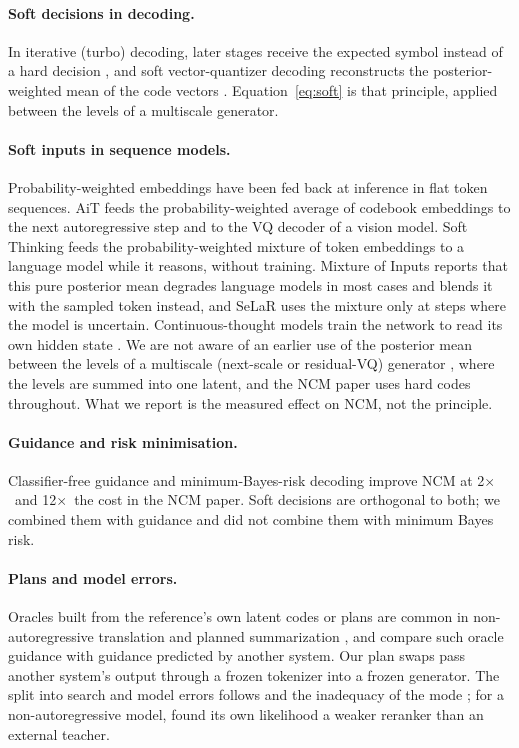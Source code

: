 \documentclass[11pt]{article}
\newcommand{\x}{$\times$}
\begin{document}
\paragraph{Soft decisions in decoding.} In iterative (turbo) decoding, later stages receive the expected symbol
instead of a hard decision \citep{wang1999iterative}, and soft vector-quantizer decoding reconstructs the
posterior-weighted mean of the code vectors \citep{skoglund1999soft}. Equation~\ref{eq:soft} is that principle,
applied between the levels of a multiscale generator.

\paragraph{Soft inputs in sequence models.} Probability-weighted embeddings have been fed back at inference in flat
token sequences. AiT \citep{ning2023ait} feeds the probability-weighted average of codebook embeddings to the next
autoregressive step and to the VQ decoder of a vision model. Soft Thinking \citep{zhang2025softthinking} feeds the
probability-weighted mixture of token embeddings to a language model while it reasons, without training. Mixture of
Inputs \citep{zhuang2025moi} reports that this pure posterior mean degrades language models in most cases and blends
it with the sampled token instead, and SeLaR \citep{selar2026} uses the mixture only at steps where the model is
uncertain. Continuous-thought models train the network to read its own hidden state \citep{hao2024coconut}. We are not aware of an earlier use of the posterior mean between the levels of a multiscale
(next-scale or residual-VQ) generator \citep{tian2024var,lee2022rqvae}, where the levels are summed into one latent,
and the NCM paper uses hard codes throughout. What we report is the measured effect on NCM, not the principle.

\paragraph{Guidance and risk minimisation.} Classifier-free guidance \citep{ho2022cfg} and minimum-Bayes-risk decoding
\citep{kumar2004mbr,eikema2020map} improve NCM at 2\x\ and 12\x\ the cost in the NCM paper. Soft decisions are
orthogonal to both; we combined them with guidance and did not combine them with minimum Bayes risk.

\paragraph{Plans and model errors.} Oracles built from the reference's own latent codes or plans are common in
non-autoregressive translation and planned summarization \citep{bao2021cnat,narayan2021frost}, and
\citet{dou2021gsum} compare such oracle guidance with guidance predicted by another system. Our plan swaps pass another
system's output through a frozen tokenizer into a frozen generator. The split into search and model errors follows
\citet{stahlberg2019nmt} and the inadequacy of the mode \citep{eikema2020map}; for a non-autoregressive model,
\citet{ma2019flowseq} found its own likelihood a weaker reranker than an external teacher.
\end{document}
